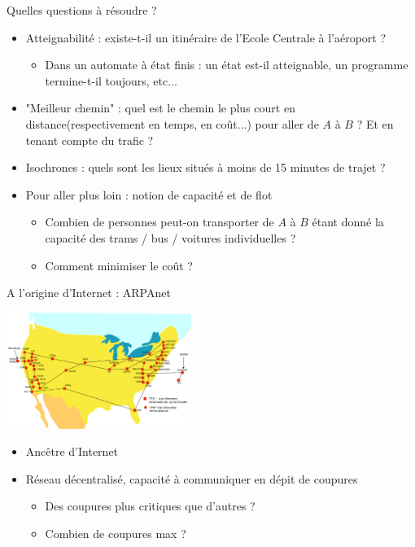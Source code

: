 \begin{frame}{Quelles questions à résoudre ?}
    \begin{itemize}
        \item Atteignabilité : existe-t-il un itinéraire de l'Ecole Centrale à l'aéroport ?
        \begin{itemize}
            \item Dans un automate à état finis : un état est-il atteignable, un programme termine-t-il toujours, etc...
        \end{itemize}
        \item "Meilleur chemin" : quel est le chemin le plus court en distance(respectivement en temps, en coût...) pour aller de $A$ à $B$  ? Et en tenant compte du trafic ?
        \item Isochrones : quels sont les lieux situés à moins de 15 minutes de trajet ? 
        \item Pour aller plus loin : notion de capacité et de flot 
        \begin{itemize}
            \item Combien de personnes peut-on transporter de $A$ à $B$ étant donné la capacité des trams / bus / voitures individuelles ? 
            \item Comment minimiser le coût ?
        \end{itemize}
    \end{itemize}
\end{frame}

\begin{frame}{A l'origine d'Internet : ARPAnet}
    \begin{center}
        \includegraphics[width=6cm]{fig/Arpanet_1974.pdf}
    \end{center}
    \begin{itemize}
        \item Ancêtre d'Internet 
        \item Réseau décentralisé, capacité à communiquer en dépit de coupures 
        \begin{itemize}
            \item Des coupures plus critiques que d'autres ?
            \item Combien de coupures max ?
        \end{itemize}
    \end{itemize}
\end{frame}

